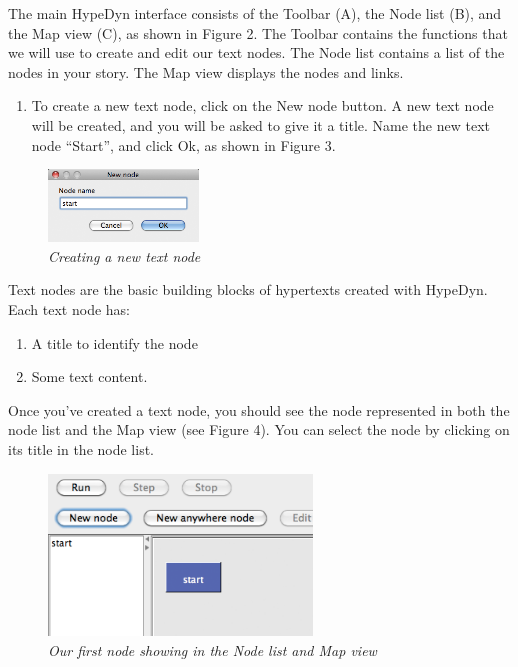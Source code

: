\documentclass{article}
\begin{document}
The main HypeDyn interface consists of the Toolbar (A), the Node list (B), and
the Map view (C), as shown in Figure 2. The Toolbar contains the functions that
we will use to create and edit our text nodes. The Node list contains a list of
the nodes in your story. The Map view displays the nodes and links.

\begin{enumerate}
  \item To create a new text node, click on the New node button. A new text node
  will be created, and you will be asked to give it a title. Name the new text
  node ``Start'', and click Ok, as shown in Figure 3.  
\end{enumerate}

 
\begin{figure}[ht]
  \centering
  \includegraphics[width=4cm]{images/hypedyn-tutorial-1-figure-3}
  \caption{\textit{Creating a new text node}}
\end{figure} 

Text nodes are the basic building blocks of hypertexts created with HypeDyn.
Each text node has: 
\begin{enumerate}
  \item A title to identify the node
  \item Some text content.
\end{enumerate}

Once you've created a text node, you should see the node represented in both
the node list and the Map view (see Figure 4). You can select the node by
clicking on its title in the node list. 
 
\begin{figure}[ht]
  \centering
  \includegraphics[width=7cm]{images/hypedyn-tutorial-1-figure-4}
  \caption{\textit{Our first node showing in the Node list and Map view}}
\end{figure} 
\end{document}
